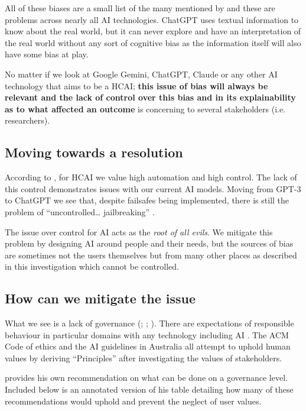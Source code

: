 All of these biases are a small list of the many mentioned by \textcite{Ray2023} and these are problems across nearly all AI technologies. ChatGPT uses textual information to know about the real world, but it can never explore and have an interpretation of the real world without any sort of cognitive bias as the information itself will also have some bias at play. 

No matter if we look at Google Gemini, ChatGPT, Claude or any other AI technology that aims to be a HCAI; \textbf{this issue of bias will always be relevant and the lack of control over this bias and in its explainability as to what affected an outcome} is concerning to several stakeholders (i.e. researchers).

\subsection{Moving towards a resolution}

According to \textcite{Shneiderman2020}, for HCAI we value high automation and high control. The lack of this control demonstrates issues with our current AI models. Moving from GPT-3 to ChatGPT we see that, despite failsafes being implemented, there is still the problem of “uncontrolled… jailbreaking” \parencite{Boxleitner2023}.

The issue over control for AI acts as the \textit{root of all evils}. We mitigate this problem by designing AI around people and their needs, but the sources of bias are sometimes not the users themselves but from many other places as described in this investigation which cannot be controlled. 

\subsection{How can we mitigate the issue}

What we see is a lack of governance (\cite{win3zz_2024_githubleakedapikeysandsecretsmd}; \cite{hern_2023_i}; \cite{lifshitz_2025_scraping}). There are expectations of responsible behaviour in particular domains with any technology including AI \parencite{Roman2024}. The ACM Code of ethics \parencite{associationforcomputingmachinery_2018_acm} and the AI guidelines in Australia \parencite{departmentofindustryscienceandresources_2024_australias} all attempt to uphold human values by deriving “Principles” after investigating the values of stakeholders. 

\textcite{Shneiderman2020} provides his own recommendation on what can be done on a governance level. Included below is an annotated version of his table detailing how many of these recommendations would uphold and prevent the neglect of user values.


